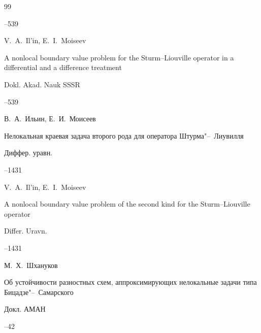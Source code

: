 \begin{thebibliography}{99}



--539

\misctransl 

\by V.~A.~Il'in,  E.~I.~Moiseev 

\paper A nonlocal boundary value problem for the Sturm--Liouville operator in a differential and a difference treatment

\jour Dokl. Akad. Nauk SSSR 




–539






\by В.~А.~Ильин, Е.~И.~Моисеев

\paper Нелокальная краевая задача второго рода для оператора Штурма"--~Лиувилля

\jour Диффер. уравн.




--1431

\misctransl 

\by V.~A.~Il'in,  E.~I.~Moiseev 

\paper A nonlocal boundary value problem of the second kind for the Sturm--Liouville operator

\jour Differ. Uravn.




–1431








\by М.~Х.~Шхануков

\paper Об устойчивости разностных схем, аппроксимирующих нелокальные задачи типа Бицадзе"--~Самарского

\jour Докл. АМАН




--42

\misctransl


\end{thebibliography}
